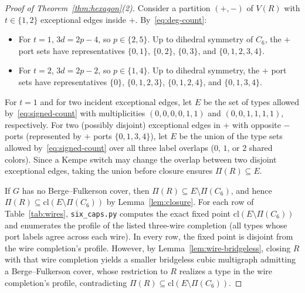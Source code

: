 \documentclass[11pt]{article}
\begin{document}
\begin{proof}[Proof of Theorem~\ref{thm:hexagon}(2)]
Consider a partition $(+,-)$ of $V(R)$ with $t \in \{1,2\}$ exceptional edges inside $+$.
By~\eqref{eq:deg-count}:
\begin{itemize}
  \item For $t = 1$, $3d = 2p - 4$, so $p \in \{2, 5\}$. Up to dihedral symmetry of $C_6$,
        the $+$ port sets have representatives $\{0,1\}$, $\{0,2\}$, $\{0,3\}$, and
        $\{0,1,2,3,4\}$.
  \item For $t = 2$, $3d = 2p - 2$, so $p \in \{1, 4\}$. Up to dihedral symmetry, the $+$
        port sets have representatives $\{0\}$, $\{0,1,2,3\}$, $\{0,1,2,4\}$, and
        $\{0,1,3,4\}$.
\end{itemize}
For $t = 1$ and for two incident exceptional edges, let $E$ be the set of types allowed
by~\eqref{eq:signed-count} with multiplicities $(0,0,0,0,1,1)$ and $(0,0,1,1,1,1)$,
respectively. For two (possibly disjoint) exceptional edges in $+$ with opposite $-$
ports (represented by $+$ ports $\{0,1,3,4\}$), let $E$ be the union of the type sets
allowed by~\eqref{eq:signed-count} over all three label overlaps ($0$, $1$, or $2$ shared
colors). Since a Kempe switch may change the overlap between two disjoint exceptional
edges, taking the union before closure ensures $\Pi(R) \subseteq E$.

If $G$ has no Berge--Fulkerson cover, then $\Pi(R) \subseteq E \setminus \Pi(C_6)$, and
hence $\Pi(R) \subseteq \mathrm{cl}(E \setminus \Pi(C_6))$ by Lemma~\ref{lem:closure}.
For each row of Table~\ref{tab:wires}, \texttt{six\_caps.py} computes the exact fixed
point $\mathrm{cl}(E \setminus \Pi(C_6))$ and enumerates the profile of the listed
three-wire completion (all types whose port labels agree across each wire). In every row,
the fixed point is disjoint from the wire completion's profile. However, by
Lemma~\ref{lem:wire-bridgeless}, closing $R$ with that wire completion yields a smaller
bridgeless cubic multigraph admitting a Berge--Fulkerson cover, whose restriction to $R$
realizes a type in the wire completion's profile, contradicting
$\Pi(R) \subseteq \mathrm{cl}(E \setminus \Pi(C_6))$.
\end{proof}
\end{document}
